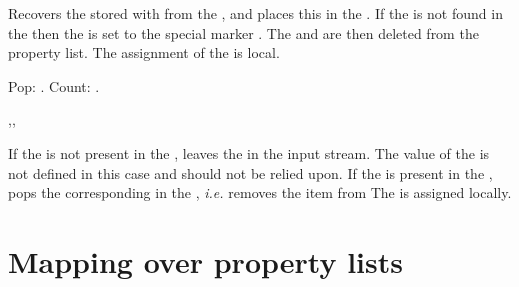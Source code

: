 \documentclass[oneside]{book}
\begin{document}
\begin{function}{\PropPop}
\begin{syntax}
   
\end{syntax}
Recovers the  stored with  from the ,
and places this in the .
If the  is not found in the
 then the  is set
to the special marker .
The  and  are then deleted from the property list.
The assignment of the  is local.
\begin{demohigh}
\PropSetFromKeyval {}
\PropPop {} \lTmpaTl
Pop: \TlUse \lTmpaTl.
Count: \PropVarCount \lTmpaProp.
\end{demohigh}
\end{function}

\begin{function}{\PropPopT,\PropPopF,\PropPopTF}
\begin{syntax}
    
    
     
\end{syntax}
If the  is not present in the , leaves
the  in the input stream.  The value of the
 is not defined in this case and should
not be relied upon.  If the  is present in
the , pops the corresponding 
in the , \emph{i.e.} removes the item from
The  is assigned locally.
\begin{demohigh}
\PropSetFromKeyval {}
\PropPopTF {}  {}
\end{demohigh}
\end{function}

\section{Mapping over property lists}

\end{document}
